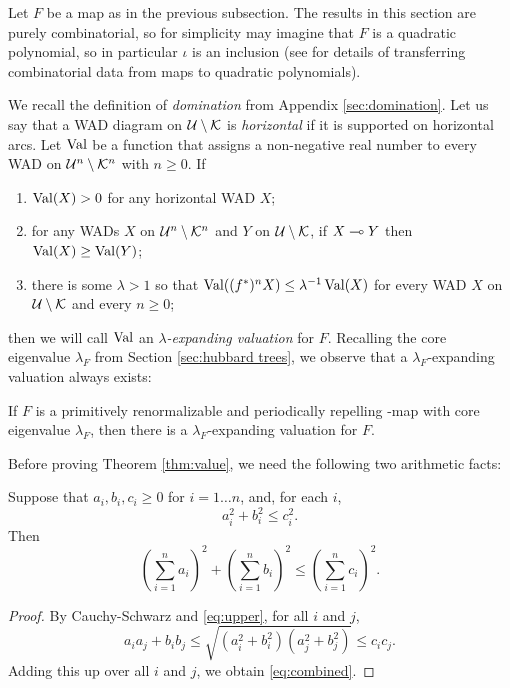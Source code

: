 


Let  $F$ be a \pql map as in the previous subsection. The results in this section are purely combinatorial, so for simplicity may imagine that $F$ is a quadratic polynomial, so in particular $\iota$ is an inclusion (see \cite[Section 4.1]{K06} for details of transferring combinatorial data from \pql maps to quadratic polynomials).

We recall the definition of \emph{domination} from Appendix \ref{sec:domination}. Let us say that a WAD diagram on $\mathcal U\setminus \mathcal K$ is \emph{horizontal} if it is supported on horizontal arcs. 
Let $\operatorname{Val}$ be a function that assigns a non-negative real number to every WAD on 
$\mathcal U^n\setminus \mathcal K^n$ with $n\geq 0$. If 
\begin{enumerate}
    \item $\operatorname{Val}(X)>0$ for any horizontal WAD $X$;
    \item for any WADs $X$ on $\mathcal U^n\setminus \mathcal K^n$ and $Y$ on $\mathcal U\setminus \mathcal K$, if $X\multimap Y$ then $\operatorname{Val}(X)\geq \operatorname{Val}(Y)$; 
    \item there is some $\lambda>1$ so that $\operatorname{Val}((f^*)^nX)\leq \lambda^{-1}\operatorname{Val}(X)$ for every WAD $X$ on $\mathcal U\setminus \mathcal K$ and every $n\geq 0$;
\end{enumerate}
then we will call $\operatorname{Val}$ an \emph{$\lambda$-expanding valuation}  for $F$. 
Recalling the core eigenvalue $\lambda_F$ from Section \ref{sec:hubbard trees}, we observe that a $\lambda_F$-expanding valuation always exists:



\begin{theorem}\label{thm:value}
    If $F$ is a primitively renormalizable and periodically repelling \pql-map with core eigenvalue $\lambda_F$, then there is a $\lambda_F$-expanding valuation for $F$.
\end{theorem}

Before proving Theorem \ref{thm:value}, we need the following two arithmetic facts:
\begin{lemma}
	Suppose that $a_i, b_i, c_i \ge 0$ for $i = 1 \ldots n$,
	and,
	for each $i$,
	\begin{equation} \label{eq:upper}
		a_i^2 + b_i^2 \le c_i^2.
	\end{equation}
	Then 
	\begin{equation} \label{eq:combined}
		\left(\sum_{i = 1}^n a_i\right)^2 + \left(\sum_{i = 1}^n b_i\right)^2 \le \left(\sum_{i = 1}^n c_i\right)^2.
	\end{equation}
\end{lemma}
\begin{proof}
	By Cauchy-Schwarz and \eqref{eq:upper},
	for all $i$ and $j$,
	\begin{equation} \label{eq:cs}
		a_i a_j + b_i b_j \le \sqrt{(a_i^2 + b_i^2)(a_j^2 + b_j^2)} \le c_i c_j.
	\end{equation}
	Adding this up over all $i$ and $j$, we obtain \eqref{eq:combined}.
\end{proof}

